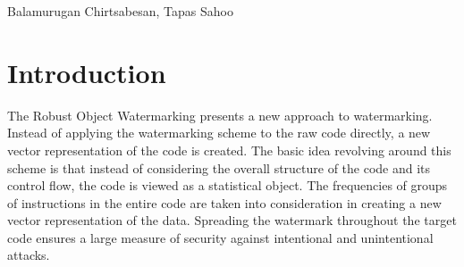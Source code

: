 %
          {Balamurugan Chirtsabesan, Tapas Sahoo}


\section{Introduction}
The Robust Object Watermarking presents a new approach to watermarking.
Instead of applying the watermarking scheme to the raw code directly, a new
vector representation of the code is created. The basic idea revolving
around this scheme is that instead of considering the overall structure of
the code and its control flow, the code is viewed as a statistical object.
The frequencies of groups of instructions in the entire code are taken into
consideration in creating a new vector representation of the data. Spreading
the watermark throughout the target code ensures a large measure of security
against intentional and unintentional attacks.

